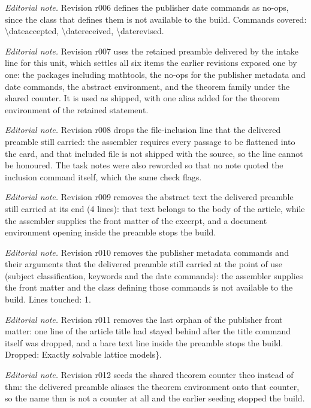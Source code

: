 \documentclass[11pt]{article}
\begin{document}
\noindent\textit{Editorial note.} Revision r006 defines the publisher date commands as no-ops, since the class that defines them is not available to the build. Commands covered: \textbackslash{}dateaccepted, \textbackslash{}datereceived, \textbackslash{}daterevised.\par\medskip
\noindent\textit{Editorial note.} Revision r007 uses the retained preamble delivered by the intake line for this unit, which settles all six items the earlier revisions exposed one by one: the packages including mathtools, the no-ops for the publisher metadata and date commands, the abstract environment, and the theorem family under the shared counter. It is used as shipped, with one alias added for the theorem environment of the retained statement.\par\medskip
\noindent\textit{Editorial note.} Revision r008 drops the file-inclusion line that the delivered preamble still carried: the assembler requires every passage to be flattened into the card, and that included file is not shipped with the source, so the line cannot be honoured. The task notes were also reworded so that no note quoted the inclusion command itself, which the same check flags.\par\medskip
\noindent\textit{Editorial note.} Revision r009 removes the abstract text the delivered preamble still carried at its end (4 lines): that text belongs to the body of the article, while the assembler supplies the front matter of the excerpt, and a document environment opening inside the preamble stops the build.\par\medskip
\noindent\textit{Editorial note.} Revision r010 removes the publisher metadata commands and their arguments that the delivered preamble still carried at the point of use (subject classification, keywords and the date commands): the assembler supplies the front matter and the class defining those commands is not available to the build. Lines touched: 1.\par\medskip
\noindent\textit{Editorial note.} Revision r011 removes the last orphan of the publisher front matter: one line of the article title had stayed behind after the title command itself was dropped, and a bare text line inside the preamble stops the build. Dropped: Exactly solvable lattice models\}.\par\medskip
\noindent\textit{Editorial note.} Revision r012 seeds the shared theorem counter theo instead of thm: the delivered preamble aliases the theorem environment onto that counter, so the name thm is not a counter at all and the earlier seeding stopped the build.\par\medskip
\end{document}
